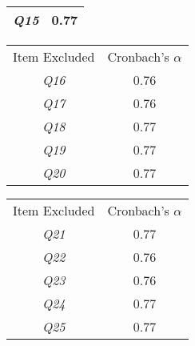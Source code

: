 \begin{table}[!htbp]
\begin{subtable}[!htbp]{0.45\textwidth}
\begin{tabular}[!htbp]{c c}
\textit{Q15} & 0.77 \\
\bottomrule
\end{tabular}
\label{tab:table2_c}
\end{subtable}
\hspace{\fill}
\begin{subtable}[!htbp]{0.45\textwidth}
\flushright
\begin{tabular}[!htbp]{c c}
\toprule
Item Excluded & Cronbach's $\alpha$ \\
\textit{Q16} & 0.76 \\
\textit{Q17} & 0.76 \\
\textit{Q18} & 0.77 \\
\textit{Q19} & 0.77 \\
\textit{Q20} & 0.77 \\
\bottomrule
\end{tabular}
\label{tab:table2_d}
\end{subtable}
\hspace{\fill}
\begin{subtable}[!htbp]{\textwidth}
\center
\begin{tabular}[!htbp]{c c}
\\
\toprule
Item Excluded & Cronbach's $\alpha$ \\
\textit{Q21} & 0.77 \\
\textit{Q22} & 0.76 \\
\textit{Q23} & 0.76 \\
\textit{Q24} & 0.77 \\
\textit{Q25} & 0.77 \\
\bottomrule
\end{tabular}
\label{tab:table2_e}
\end{subtable}
\hspace{\fill}
\label{tab:table_cronbach_exclusion}
\end{table}


